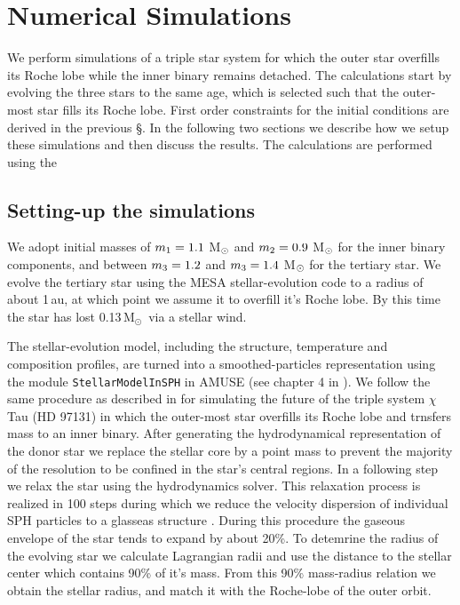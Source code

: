 \documentclass{aastex62}
\newcommand{\MSun}{\mbox{M$_\odot$}}
\begin{document}
{\section{Numerical Simulations} \label{sims}

We perform simulations of a triple star system for which the outer
star overfills its Roche lobe while the inner binary remains
detached. The calculations start by evolving the three stars to the
same age, which is selected such that the outer-most star fills its
Roche lobe.  First order constraints for the initial conditions are
derived in the previous \S. In the following two sections we describe
how we setup these simulations and then discuss the results. The
calculations are performed using the

\subsection{Setting-up the simulations}

We adopt initial masses of $m_{\rm 1} = 1.1$ M$_{\rm \odot}$ and
$m_{\rm 2} = 0.9$ M$_{\rm \odot}$ for the inner binary components, and
between $m_{\rm 3} = 1.2$ and $m_{\rm 3} = 1.4$ M$_{\rm \odot}$ for
the tertiary star.  We evolve the tertiary star using the MESA
stellar-evolution code \cite{2011ApJS..192....3P} to a radius of about
1\,au, at which point we assume it to overfill it's Roche lobe.  By
this time the star has lost 0.13\,\MSun\, via a stellar wind.

The stellar-evolution model, including the structure, temperature and
composition profiles, are turned into a smoothed-particles
representation using the module {\tt StellarModelInSPH} in AMUSE (see
chapter 4 in \cite{AMUSE}).  We follow the same procedure as described
in \cite{2014MNRAS.438.1909D} for simulating the future of the triple
system $\chi$ Tau (HD 97131) in which the outer-most star overfills its
Roche lobe and trnsfers mass to an inner binary.  After generating the hydrodynamical
representation of the donor star we replace the stellar core by a
point mass to prevent the majority of the resolution to be confined in
the star's central regions.  In a following step we relax the star
using the hydrodynamics solver. This relaxation process is realized in
100 steps during which we reduce the velocity dispersion of individual
SPH particles to a glasseas structure \citep[see, for example, \S\,3.3
  on page 40 in][]{1994astro.ph.10043W}. During this procedure the
gaseous envelope of the star tends to expand by about 20\%.  To
detemrine the radius of the evolving star we calculate Lagrangian
radii and use the distance to the stellar center which contains 90\%
of it's mass. From this 90\% mass-radius relation we obtain the stellar radius,
and match it with the Roche-lobe of the outer orbit.

}
\end{document}
